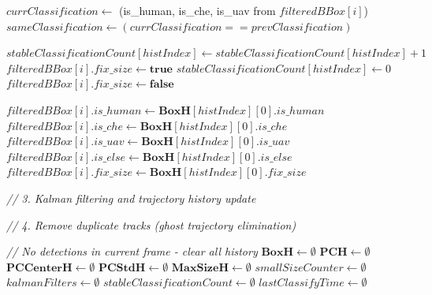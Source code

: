 \documentclass[14pt,a4paper]{article}
\begin{document}
\begin{algorithm}
\begin{algorithmic}[1]
                \State $currClassification \gets$ (is\_human, is\_che, is\_uav from $filteredBBox[i]$)
                \State $sameClassification \gets (currClassification == prevClassification)$
                
                    \State $stableClassificationCount[histIndex] \gets stableClassificationCount[histIndex] + 1$
                        \State $filteredBBox[i].fix\_size \gets \textbf{true}$
                    \EndIf
                \Else
                    \State $stableClassificationCount[histIndex] \gets 0$
                    \State $filteredBBox[i].fix\_size \gets \textbf{false}$
                \EndIf
                
                \State {}
                
            \Else
                \State $filteredBBox[i].is\_human \gets \mathbf{BoxH}[histIndex][0].is\_human$
                \State $filteredBBox[i].is\_che \gets \mathbf{BoxH}[histIndex][0].is\_che$
                \State $filteredBBox[i].is\_uav \gets \mathbf{BoxH}[histIndex][0].is\_uav$
                \State $filteredBBox[i].is\_else \gets \mathbf{BoxH}[histIndex][0].is\_else$
                \State $filteredBBox[i].fix\_size \gets \mathbf{BoxH}[histIndex][0].fix\_size$
            \EndIf
            
        \EndIf
    \EndFor
\EndIf

\State \textit{// 3. Kalman filtering and trajectory history update}
        \State {}
        
        \State \textit{// 4. Remove duplicate tracks (ghost trajectory elimination)}
        \State {}
        
    \EndIf
\Else
    \State \textit{// No detections in current frame - clear all history}
    \State $\mathbf{BoxH} \gets \emptyset$
    \State $\mathbf{PCH} \gets \emptyset$
    \State $\mathbf{PCCenterH} \gets \emptyset$
    \State $\mathbf{PCStdH} \gets \emptyset$
    \State $\mathbf{MaxSizeH} \gets \emptyset$
    \State $smallSizeCounter \gets \emptyset$
    \State $kalmanFilters \gets \emptyset$
    \State $stableClassificationCount \gets \emptyset$
    \State $lastClassifyTime \gets \emptyset$
\EndIf

\end{algorithmic}
\end{algorithm}
\end{document}
